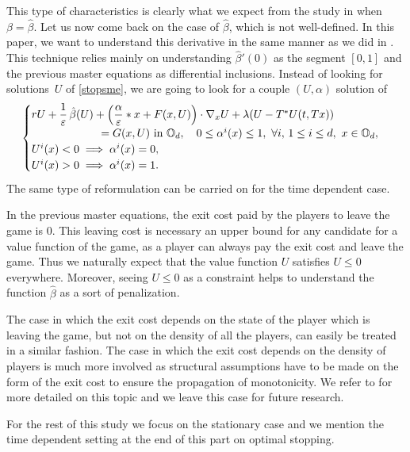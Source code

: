 \documentclass[JEP,XML,SOM,Unicode,NoEqCountersInSection,published]{cedram}
\let\epsilon\varepsilon
\theoremstyle{definition}
\begin{document}
This type of characteristics is clearly what we expect from the study in \cite{bertucci2018optimal} when $\beta = \hat{\beta}$. Let us now come back on the case of $\hat{\beta}$, which is not well-defined. In this paper, we want to understand this derivative in the same manner as we did in \cite{bertucci2018optimal}. This technique relies mainly on understanding $\hat{\beta}'(0)$ as the segment $[0,1]$ and the previous master equations as differential inclusions. Instead of looking for solutions~$U$ of \eqref{stopsme}, we are going to look for a couple $(U,\alpha)$ solution of
\begin{equation}\label{stopsme}
\begin{cases}
r U+\dfrac{1}{\epsilon}\,\hat{\beta}(U)+\Bigl(\dfrac{\alpha}{\epsilon}*x+F(x,U)\Bigr)\cdot \nabla_xU+\lambda (U-T^*U(t,Tx))\\
\hspace*{2.2cm}= G(x,U) \text{ in } \mathbb{O}_d,\quad
0 \leq \alpha^i(x) \leq 1,\ \forall i,\, 1 \leq i \leq d,\ x \in \mathbb{O}_d,\\
U^i(x) < 0 \implies \alpha^i(x) = 0,\\
U^i(x) > 0 \implies \alpha^i(x) = 1.
\end{cases}
\end{equation}
The same type of reformulation can be carried on for the time dependent case.

In the previous master equations, the exit cost paid by the players to leave the game is $0$. This leaving cost is necessary an upper bound for any candidate for a value function of the game, as a player can always pay the exit cost and leave the game. Thus we naturally expect that the value function $U$ satisfies $U \leq 0$ everywhere. Moreover, seeing $U \leq 0$ as a constraint helps to understand the function $\hat{\beta}$ as a sort of penalization.

The case in which the exit cost depends on the state of the player which is leaving the game, but not on the density of all the players, can easily be treated in a similar fashion. The case in which the exit cost depends on the density of players is much more involved as structural assumptions have to be made on the form of the exit cost to ensure the propagation of monotonicity. We refer to \cite{bertucci2018optimal} for more detailed on this topic and we leave this case for future research.

For the rest of this study we focus on the stationary case and we mention the time dependent setting at the end of this part on optimal stopping.
\end{document}

